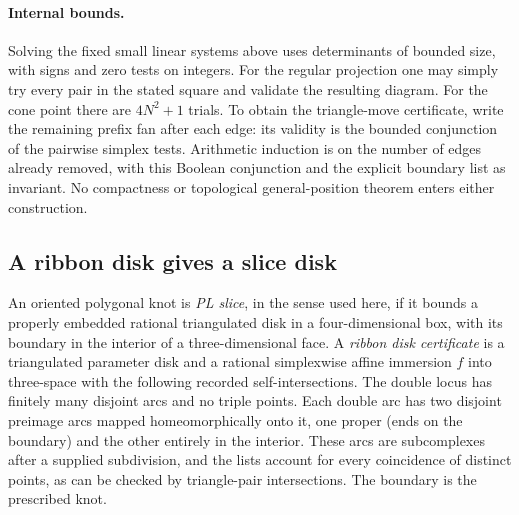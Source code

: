 \paragraph{Internal bounds.}
Solving the fixed small linear systems above uses determinants of bounded size, with signs and zero tests on integers. For the regular projection one may simply try every pair in the stated square and validate the resulting diagram. For the cone point there are $4N^2+1$ trials. To obtain the triangle-move certificate, write the remaining prefix fan after each edge: its validity is the bounded conjunction of the pairwise simplex tests. Arithmetic induction is on the number of edges already removed, with this Boolean conjunction and the explicit boundary list as invariant. No compactness or topological general-position theorem enters either construction.

\subsection{A ribbon disk gives a slice disk}
An oriented polygonal knot is \emph{PL slice}, in the sense used here, if it bounds a properly embedded rational triangulated disk in a four-dimensional box, with its boundary in the interior of a three-dimensional face. A \emph{ribbon disk certificate} is a triangulated parameter disk and a rational simplexwise affine immersion $f$ into three-space with the following recorded self-intersections. The double locus has finitely many disjoint arcs and no triple points. Each double arc has two disjoint preimage arcs mapped homeomorphically onto it, one proper (ends on the boundary) and the other entirely in the interior. These arcs are subcomplexes after a supplied subdivision, and the lists account for every coincidence of distinct points, as can be checked by triangle-pair intersections. The boundary is the prescribed knot.

